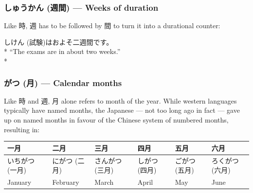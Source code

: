 \documentclass[11pt, b5paper, twoside, openright, onecolumn]{book}
\makeatletter
\newcommand*{\rtrubystack}[2]{{\relscale{0.5}%
  \begin{tabular}[b]{@{}c@{}}%
    {#1}\\%
    {\textscale{2}{#2}}%
  \end{tabular}}%
}
\DeclareRobustCommand*{\rtruby}[2]{%
  \mbox{%
    \setlength{\parskip}{0ex}%
    \BeginAccSupp{method=pdfstringdef,ActualText={#1}}%
      \rtrubystack{\phantom{#2}}{#1}%
      \llap{%
        \rtrubystack{#2}{\phantom{#1}}%
      }%
    \EndAccSupp{}%
  }%
}
\newcommand*{\rubystack}[2]{{\relscale{0.5}%
  \begin{tabular}[b]{@{}c@{}}%
    {#1}\\%
   {\textscale{2}{#2}}%
  \end{tabular}}%
}
\DeclareRobustCommand*{\ruby}[2]{%
  \mbox{%
    \setlength{\parskip}{0ex}%
    \BeginAccSupp{method=pdfstringdef,ActualText={#1}}%
      \rubystack{\phantom{#2}}{#1}%
      \llap{%
        \rubystack{#2}{\phantom{#1}}%
      }%
    \EndAccSupp{}%
  }%
}
\renewcommand*{\rtruby}[2]{#2 (#1)}%
\renewcommand*{\ruby}[2]{#2 (#1)}%
\newenvironment{exampleblock}{
\setlength{\parindent}{0.6in}
\begin{minipage}[t]{\dimexpr\textwidth-\parindent}}
{\end{minipage}}
\newenvironment{mytabularcentered}[1]{\noindent
\begin{center}\begin{tabular}[h]{#1}}{\end{tabular}\end{center}}
\makeatother
\begin{document}
\subsubsection{\ruby{週間}{しゅうかん} — Weeks of duration}


Like 時‚ 週 has to be followed by 間 to turn it into a durational counter:

\vspace{0.4cm}
\begin{exampleblock}
\ruby{試験}{しけん}はおよそ二週間です。 \\* 
“The exams are in about two weeks.” \\* 
\end{exampleblock}
\subsubsection{がつ (月) — Calendar months}


Like 時 and 週‚ 月 alone refers to month of the year. While western languages typically have named months‚ the Japanese — not too long ago in fact — gave up on named months in favour of the Chinese system of numbered months‚ resulting in:

\vspace{0.5cm}
\smaller
\begin{center}
\begin{mytabularcentered}{| l  l  l  l  l  l |}\hline 
\rule{0pt}{2.4ex}一月 & 二月 & 三月 & 四月 & 五月 & 六月\\ 
\hline
\rule{0pt}{3.6ex}\index[japanese]{いちがつ (一月)}\rtruby{一月}{いちがつ} & \index[japanese]{にがつ (二月)}\rtruby{二月}{にがつ} & \index[japanese]{さんがつ (三月)}\rtruby{三月}{さんがつ} & \index[japanese]{しがつ (四月)}\rtruby{四月}{しがつ} & \index[japanese]{ごがつ (五月)}\rtruby{五月}{ごがつ} & \index[japanese]{ろくがつ (六月)}\rtruby{六月}{ろくがつ}\\ 
\rule{0pt}{2.4ex}January & February & March & April & May & June\\ 
\hline 
\end{mytabularcentered}
\end{center}
\larger
\vspace{0.5cm}
\end{document}
